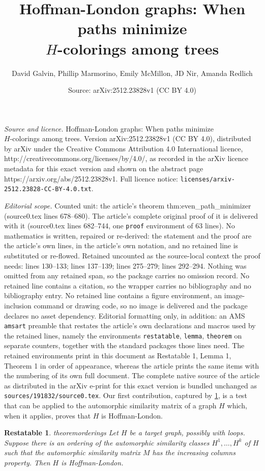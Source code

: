 \documentclass[10pt,a4paper]{amsart}
\title{Hoffman-London graphs: When paths minimize\\ $H$-colorings among trees}
\author{David Galvin, Phillip Marmorino, Emily McMillon, JD Nir, Amanda Redlich}
\date{Source: arXiv:2512.23828v1 (CC BY 4.0)}
\newtheorem{restatable}{Restatable}
\begin{document}
\maketitle

\noindent\emph{Source and licence.} Hoffman-London graphs: When paths minimize\\ $H$-colorings among trees. Version arXiv:2512.23828v1 (CC BY 4.0), distributed by arXiv under the Creative Commons Attribution 4.0 International licence, http://creativecommons.org/licenses/by/4.0/, as recorded in the arXiv licence metadata for this exact version and shown on the abstract page https://arxiv.org/abs/2512.23828v1. Full licence notice: \texttt{licenses/arxiv-2512.23828-CC-BY-4.0.txt}.\par\smallskip

\noindent\textit{Editorial scope.} Counted unit: the article's theorem thm:even\_path\_minimizer (source0.tex lines 678--680). The article's complete original proof of it is delivered with it (source0.tex lines 682--744, one \texttt{proof} environment of 63 lines). No mathematics is written, repaired or re-derived: the statement and the proof are the article's own lines, in the article's own notation, and no retained line is substituted or re-flowed.  Retained uncounted as the source-local context the proof needs: lines 130--133; lines 137--139; lines 275--279; lines 292--294.  Nothing was omitted from any retained span, so the package carries no omission record.  No retained line contains a citation, so the wrapper carries no bibliography and no bibliography entry.  No retained line contains a figure environment, an image-inclusion command or drawing code, so no image is delivered and the package declares no asset dependency.  Editorial formatting only, in addition: an AMS \texttt{amsart} preamble that restates the article's own declarations and macros used by the retained lines, namely the environments \texttt{restatable}, \texttt{lemma}, \texttt{theorem} on separate counters, together with the standard packages those lines need.  The retained environments print in this document as Restatable 1, Lemma 1, Theorem 1 in order of appearance, whereas the article prints the same items with the numbering of its own full document.  The complete native source of the article as distributed in the arXiv e-print for this exact version is bundled unchanged as \texttt{sources/191832/source0.tex}.
Our first contribution, captured by \cref{thm:ordering_framework}, is a test that can be applied to the automorphic similarity matrix of a graph $H$ which, when it applies, proves that $H$ is Hoffman-London. 
\begin{restatable}{theorem}{orderings} \label{thm:ordering_framework}
Let $H$ be a target graph, possibly with loops. Suppose there is an ordering of the automorphic similarity classes $H^1, \ldots, H^k$ of $H$ such that the automorphic similarity matrix $M$ has the increasing columns property. Then $H$ is Hoffman-London. 
\end{restatable}
\end{document}

